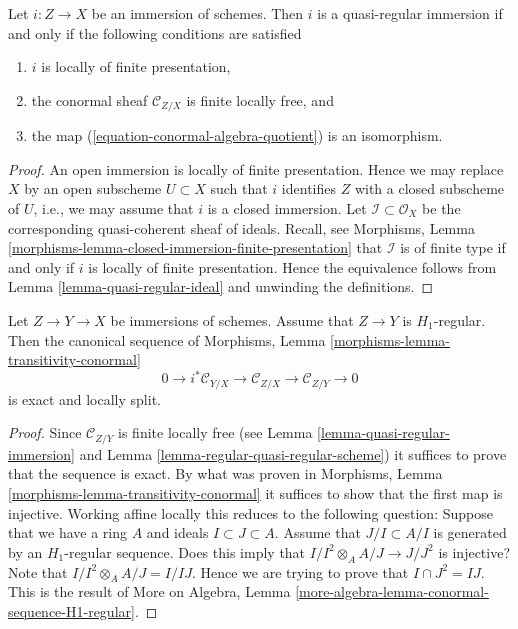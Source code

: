 \begin{lemma}
\label{lemma-quasi-regular-immersion}
Let $i : Z \to X$ be an immersion of schemes. Then $i$ is a quasi-regular
immersion if and only if the following conditions are satisfied
\begin{enumerate}
\item $i$ is locally of finite presentation,
\item the conormal sheaf $\mathcal{C}_{Z/X}$ is finite locally free, and
\item the map (\ref{equation-conormal-algebra-quotient}) is an isomorphism.
\end{enumerate}
\end{lemma}

\begin{proof}
An open immersion is locally of finite presentation. Hence we may
replace $X$ by an open subscheme $U \subset X$ such that $i$ identifies
$Z$ with a closed subscheme of $U$, i.e., we may assume that $i$
is a closed immersion. Let $\mathcal{I} \subset \mathcal{O}_X$ be the
corresponding quasi-coherent sheaf of ideals. Recall, see
Morphisms, Lemma \ref{morphisms-lemma-closed-immersion-finite-presentation}
that $\mathcal{I}$ is of finite type if and only if $i$ is locally
of finite presentation. Hence the equivalence follows from
Lemma \ref{lemma-quasi-regular-ideal}
and unwinding the definitions.
\end{proof}

\begin{lemma}
\label{lemma-transitivity-conormal-quasi-regular}
Let $Z \to Y \to X$ be immersions of schemes. Assume that
$Z \to Y$ is $H_1$-regular. Then the canonical sequence of
Morphisms, Lemma \ref{morphisms-lemma-transitivity-conormal}
$$
0 \to i^*\mathcal{C}_{Y/X} \to
\mathcal{C}_{Z/X} \to
\mathcal{C}_{Z/Y} \to 0
$$
is exact and locally split.
\end{lemma}

\begin{proof}
Since $\mathcal{C}_{Z/Y}$ is finite locally free (see
Lemma \ref{lemma-quasi-regular-immersion}
and
Lemma \ref{lemma-regular-quasi-regular-scheme})
it suffices to prove that the sequence is exact. By what was proven in
Morphisms, Lemma \ref{morphisms-lemma-transitivity-conormal}
it suffices to show that the first map is injective.
Working affine locally this reduces to the following question:
Suppose that we have a ring $A$ and ideals $I \subset J \subset A$.
Assume that $J/I \subset A/I$ is generated by an $H_1$-regular sequence.
Does this imply that $I/I^2 \otimes_A A/J \to J/J^2$ is injective?
Note that $I/I^2 \otimes_A A/J = I/IJ$. Hence we are trying to prove
that $I \cap J^2 = IJ$. This is the result of
More on Algebra, Lemma \ref{more-algebra-lemma-conormal-sequence-H1-regular}.
\end{proof}

